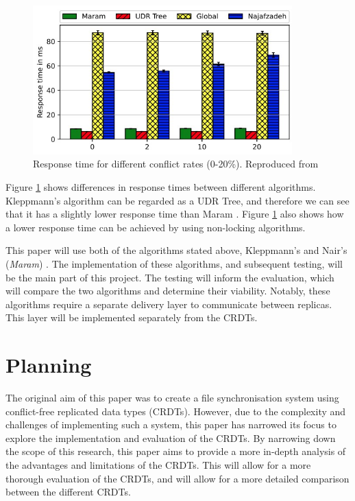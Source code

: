 \documentclass[12pt]{report}
\begin{document}
\begin{figure}[H]
    \centering
    \includegraphics[width=10cm]{Response.jpg}
    \caption{Response time for different conflict rates (0-20\%). Reproduced from \cite{https://doi.org/10.48550/arxiv.2103.04828}}
    \label{fig:responsetime}
\end{figure}

Figure \ref{fig:responsetime} shows differences in response times between different algorithms. Kleppmann's algorithm \cite{9563274} can be regarded as a UDR Tree, and therefore we can see that it has a slightly lower response time than Maram \cite{https://doi.org/10.48550/arxiv.2103.04828}. Figure \ref{fig:responsetime} also shows how a lower response time can be achieved by using non-locking algorithms.


This paper will use both of the algorithms stated above, Kleppmann's \cite{9563274} and Nair's (\textit{Maram}) \cite{https://doi.org/10.48550/arxiv.2103.04828}. The implementation of these algorithms, and subsequent testing, will be the main part of this project. The testing will inform the evaluation, which will compare the two algorithms and determine their viability. Notably, these algorithms require a separate delivery layer to communicate between replicas. This layer will be implemented separately from the CRDTs.


\newpage
\chapter{Planning}
The original aim of this paper was to create a file synchronisation system using conflict-free replicated data types (CRDTs). However, due to the complexity and challenges of implementing such a system, this paper has narrowed its focus to explore the implementation and evaluation of the CRDTs. By narrowing down the scope of this research, this paper aims to provide a more in-depth analysis of the advantages and limitations of the CRDTs. This will allow for a more thorough evaluation of the CRDTs, and will allow for a more detailed comparison between the different CRDTs.
\end{document}
